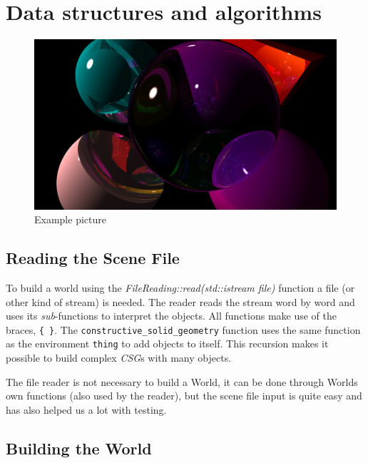 
\section{Data structures and algorithms}
	

	\begin{figure}
		\centering
		\includegraphics[width=\textwidth]{../img/shapes.png}
		\caption{Example picture}
		\label{f:shape}
	\end{figure}
	
	\subsection{Reading the Scene File}
		
		To build a world using the \emph{FileReading::read(std::istream file)} function a file (or other kind of stream) is needed. The reader reads the stream word by word and uses its \emph{sub}-functions to interpret the objects. All functions make use of the braces, \texttt{\{ \}}. The \texttt{constructive\_solid\_geometry} function uses the same function as the environment \texttt{thing} to add objects to itself. This recursion makes it possible to build complex \emph{CSG}s with many objects.

		The file reader is not necessary to build a World, it can be done through Worlds own functions (also used by the reader), but the scene file input is quite easy and has also helped us a lot with testing.
	
	\subsection{Building the World}
	
